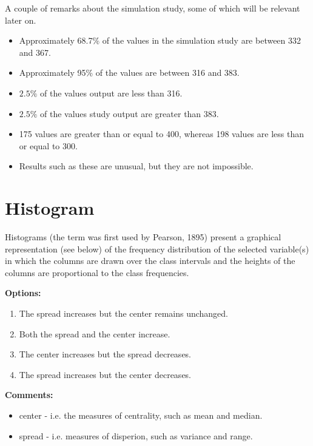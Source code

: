 \documentclass[]{report}
\begin{document}
A couple of remarks about the simulation study, some of which will be relevant later on.
\begin{itemize}
	\item Approximately 68.7\% of the values in the simulation study are between 332 and 367.
	\item Approximately 95\% of the values are between 316 and 383.
	\item $2.5\%$ of the values output are less than 316.
	\item $2.5\%$ of the values study output are greater than 383.
	\item 175 values are greater than or equal to 400, whereas 198 values are less than or equal to 300.
	\item Results such as these are unusual, but they are not impossible.
\end{itemize}

	\section{Histogram}
	Histograms (the term was first used by Pearson, 1895) present a graphical representation (see below) of the frequency distribution of the selected variable(s) in which the columns are drawn over the class intervals and the heights of the columns are proportional to the class frequencies.
	
	\noindent\textbf{Options:}
	\begin{enumerate}
		\item The spread increases but the center remains unchanged.
		\item Both the spread and the center increase.
		\item The center increases but the spread decreases.
		\item The spread increases but the center decreases.
	\end{enumerate}
	
	\noindent \textbf{Comments:}
	\begin{itemize}
		\item center - i.e. the measures of centrality, such as mean and median.
		\item spread - i.e. measures of disperion, such as variance and range.
	\end{itemize} 
	
\end{document}
